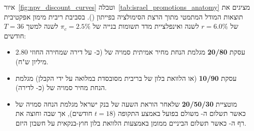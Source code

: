 איור~\ref{fig:npv_discount_curves} וטבלה~\ref{tab:israel_promotions_anatomy} מציגים את תוצאות המודל המתמטי מתוך הרצת הסימולציה בפייתון (). בסביבת ריבית מימון אפקטיבית של $r = 6.0\%$ לשנה ואינפלציית מדד תשומות בנייה של $\pi_c = 2.5\%$ לשנה למשך $T = 36$ חודשים:
\begin{itemize}[rightmargin=0.6cm]
  \item עסקת \textbf{\num{20/80}} מגלמת הנחת מחיר אמיתית סמויה של \textbf{} (כ- על דירה שמחירה החוזי \num{2.80} מיליון ש"ח).
  \item עסקת \textbf{\num{10/90}} (או הלוואת בלון של  בריבית מסובסדת במלואה על ידי הקבלן) מגלמת הנחת מחיר סמויה של \textbf{} (כ- לדירה).
  \item מוטציית \textbf{\num{20/50/30}} שלאחר הוראת השעה של בנק ישראל מגלמת הנחה סמויה של \textbf{} כאשר תשלום ה- משולם בפועל באמצע התקופה ($t=18$ חודשים), אך שבה וחוצה את רף ה-\textbf{} כאשר תשלום הביניים ממומן באמצעות הלוואת בלון חוץ-בנקאית על חשבון היזם.
\end{itemize}


